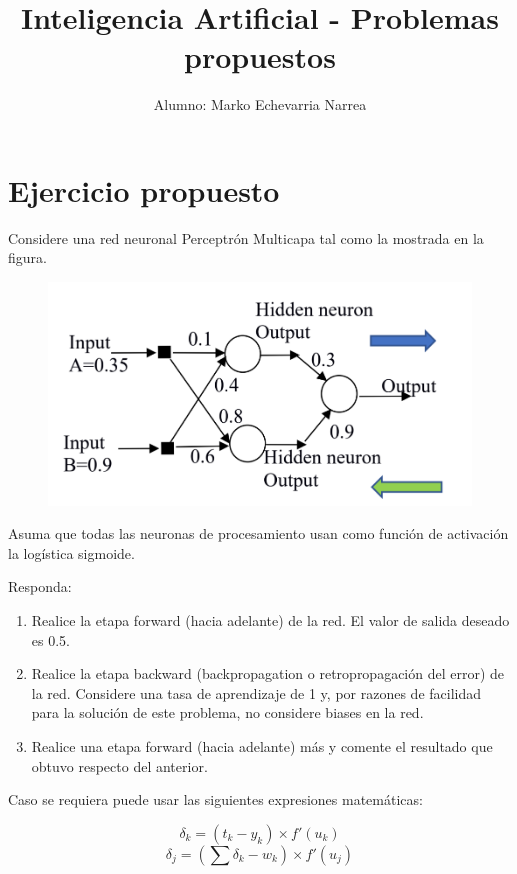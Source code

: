 \documentclass[12pt, letterpaper]{article}
\title{Inteligencia Artificial - Problemas propuestos}
\author{Alumno: Marko Echevarria Narrea}
\date{}
\begin{document}

\maketitle

\section{Ejercicio propuesto}

Considere una red neuronal Perceptrón Multicapa tal como la mostrada en la figura.

\begin{figure}[h!]
    \centering
    \includegraphics[width=0.8\linewidth]{image_problem.png}
    \label{fig:enter-label}
\end{figure}

Asuma que todas las neuronas de procesamiento usan como función de activación la logística sigmoide.

Responda:

\renewcommand{\theenumi}{\alph{enumi}}
\begin{enumerate}
    \item Realice la etapa forward (hacia adelante) de la red. El valor de salida deseado es 0.5.
    \item Realice la etapa backward (backpropagation o retropropagación del error) de la red. Considere una tasa de aprendizaje de 1 y, por razones de facilidad para la solución de este problema, no considere biases en la red.
    \item Realice una etapa forward (hacia adelante) más y comente el resultado que obtuvo respecto del anterior.
\end{enumerate}

Caso se requiera puede usar las siguientes expresiones matemáticas:

\[ \delta_k = ( t_k - y_k ) \times f'(u_k) \]
\[ \delta_j = ( \sum \delta_k - w_k ) \times f'(u_j) \]
\end{document}
